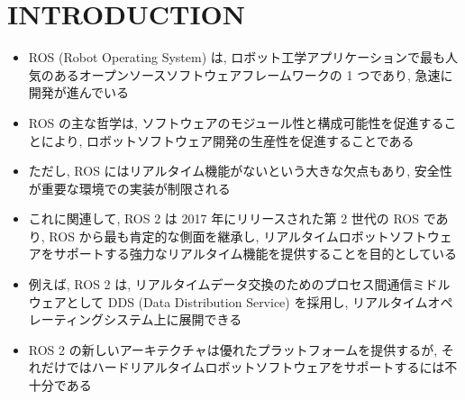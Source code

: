 
\section{INTRODUCTION}
\label{sec: introduction}

\begin{frame}{}
    \begin{itemize}
        \item ROS (Robot Operating System) は, ロボット工学アプリケーションで最も人気のあるオープンソースソフトウェアフレームワークの 1 つであり, 急速に開発が進んでいる
        \item ROS の主な哲学は, ソフトウェアのモジュール性と構成可能性を促進することにより, ロボットソフトウェア開発の生産性を促進することである
        \item ただし, ROS にはリアルタイム機能がないという大きな欠点もあり, 安全性が重要な環境での実装が制限される
        \item これに関連して, ROS 2 は 2017 年にリリースされた第 2 世代の ROS であり, ROS から最も肯定的な側面を継承し, リアルタイムロボットソフトウェアをサポートする強力なリアルタイム機能を提供することを目的としている
        \item 例えば, ROS 2 は, リアルタイムデータ交換のためのプロセス間通信ミドルウェアとして DDS (Data Distribution Service) を採用し, リアルタイムオペレーティングシステム上に展開できる
        \item ROS 2 の新しいアーキテクチャは優れたプラットフォームを提供するが, それだけではハードリアルタイムロボットソフトウェアをサポートするには不十分である
    \end{itemize}
\end{frame}

